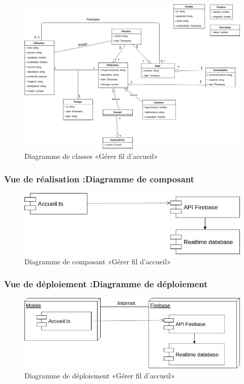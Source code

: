 \documentclass[11pt,a4paper,oneside]{book}
\begin{document}
					\begin{figure}[H]
						\centering
						\includegraphics[width=1\textwidth]{Images/ch3/classeFilAcceuil}
						\caption{Diagramme de classes «Gérer fil d'accueil»}
						\label{fig:classefilacceuil}
					\end{figure}
					
					\subsubsection{Vue de réalisation :Diagramme de composant}
					\begin{figure}[H]
						\centering
						\includegraphics[width=1\textwidth]{Images/ch3/ComposantAccueil}
						\caption{Diagramme de composant «Gérer fil d'accueil»}
						\label{fig:composantaccueil}
					\end{figure}
					\subsubsection{Vue de déploiement :Diagramme de déploiement}
					\begin{figure}[H]
						\centering
						\includegraphics[width=1\textwidth]{Images/ch3/deploimentAcceuil}
						\caption{Diagramme de déploiement «Gérer fil d'accueil»}
						\label{fig:deploimentacceuil}
					\end{figure}
\end{document}

